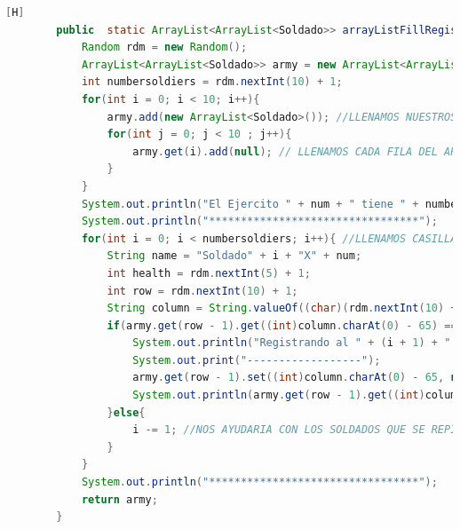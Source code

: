 \documentclass{article}
\begin{document}
	\begin{lstlisting}[language=java,caption={Las lineas de codigos del metodo creado:}][H]
		public  static ArrayList<ArrayList<Soldado>> arrayListFillRegister(int num){
			Random rdm = new Random();
			ArrayList<ArrayList<Soldado>> army = new ArrayList<ArrayList<Soldado>>();
			int numbersoldiers = rdm.nextInt(10) + 1;
			for(int i = 0; i < 10; i++){
				army.add(new ArrayList<Soldado>()); //LLENAMOS NUESTROS ARRAYLIST BIDIMENSIONAL CON CADA FILA PARA QUE CUMPLAN CON ESTRUCTURA DEL TABLERO
				for(int j = 0; j < 10 ; j++){
					army.get(i).add(null); // LLENAMOS CADA FILA DEL ARRAYLIST CON UN OBJETO SOLDADO CON TAL QUE ESTE SEA NULL PARA QUE SEPA QUE ESTE TIENE UNA CASILLA PERO NO HAY NADIE TODAVIA SE PUEDE LLENAR 
				}
			}
			System.out.println("El Ejercito " + num + " tiene " + numbersoldiers + " soldados : " ); 
			System.out.println("*********************************");
			for(int i = 0; i < numbersoldiers; i++){ //LLENAMOS CASILLAS CON CADA SOLDADO CREADO ALEATORIAMENTE
				String name = "Soldado" + i + "X" + num;
				int health = rdm.nextInt(5) + 1;
				int row = rdm.nextInt(10) + 1;
				String column = String.valueOf((char)(rdm.nextInt(10) + 65)); //REUTILIZAMOS CODIGO DEL ANTERIOR ARCHIVO VIDEOJUEGO3.JAVA YA QUE TENDRIAN LA MISMA FUNCIONALIDAD
				if(army.get(row - 1).get((int)column.charAt(0) - 65) == null){
					System.out.println("Registrando al " + (i + 1) + " soldado del Ejercito " + num + "");
					System.out.print("------------------");
					army.get(row - 1).set((int)column.charAt(0) - 65, new Soldado(name, health, row, column));
					System.out.println(army.get(row - 1).get((int)column.charAt(0) - 65).toString());
				}else{
					i -= 1; //NOS AYUDARIA CON LOS SOLDADOS QUE SE REPITEN EN EL MISMO CASILLERO CON TAL QUE NO DEBERIA CONTAR 
				}
			}
			System.out.println("*********************************");
			return army;
		}
	\end{lstlisting}
\end{document}

